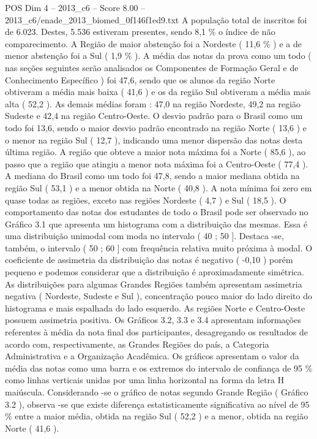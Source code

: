 \begin{textsample}{POS Dim 4 – 2013\_c6 – Score 8.00 – 2013\_c6/enade\_2013\_biomed\_0f146f1ed9.txt}
A população total de inscritos foi de 6.023.
Destes, 5.536 estiveram presentes, sendo 8,1 \% o índice de não comparecimento.
A Região de maior abstenção foi a Nordeste ( 11,6 \% ) e a de menor abstenção foi a Sul ( 1,9 \% ).
A média das notas da prova como um todo ( nas seções seguintes serão analisados os Componentes de Formação Geral e de Conhecimento Específico ) foi 47,6, sendo que os alunos da região Norte obtiveram a média mais baixa ( 41,6 ) e os da região Sul obtiveram a média mais alta ( 52,2 ).
As demais médias foram : 47,0 na região Nordeste, 49,2 na região Sudeste e 42,4 na região Centro-Oeste.
O desvio padrão para o Brasil como um todo foi 13,6, sendo o maior desvio padrão encontrado na região Norte ( 13,6 ) e o menor na região Sul ( 12,7 ), indicando uma menor dispersão das notas desta última região.
A região que obteve a maior nota máxima foi a Norte ( 85,6 ), ao passo que a região que atingiu a menor nota máxima foi a Centro-Oeste ( 77,4 ).
A mediana do Brasil como um todo foi 47,8, sendo a maior mediana obtida na região Sul ( 53,1 ) e a menor obtida na Norte ( 40,8 ).
A nota mínima foi zero em quase todas as regiões, exceto nas regiões Nordeste ( 4,7 ) e Sul ( 18,5 ).
O comportamento das notas dos estudantes de todo o Brasil pode ser observado no Gráfico 3.1 que apresenta um histograma com a distribuição das mesmas.
Essa é uma distribuição unimodal com moda no intervalo ( 40 ; 50 ].
Destaca -se, também, o intervalo ( 50 ; 60 ] com frequência relativa muito próxima à modal.
O coeficiente de assimetria da distribuição das notas é negativo ( -0,10 ) porém pequeno e podemos considerar que a distribuição é aproximadamente simétrica.
As distribuições para algumas Grandes Regiões também apresentam assimetria negativa ( Nordeste, Sudeste e Sul ), concentração pouco maior do lado direito do histograma e mais espalhada do lado esquerdo.
As regiões Norte e Centro-Oeste possuem assimetria positiva.
Os Gráficos 3.2, 3.3 e 3.4 apresentam informações referentes à média da nota final dos participantes, desagregando os resultados de acordo com, respectivamente, as Grandes Regiões do país, a Categoria Administrativa e a Organização Acadêmica.
Os gráficos apresentam o valor da média das notas como uma barra e os extremos do intervalo de confiança de 95 \% como linhas verticais unidas por uma linha horizontal na forma da letra H maiúscula.
Considerando -se o gráfico de notas segundo Grande Região ( Gráfico 3.2 ), observa -se que existe diferença estatisticamente significativa ao nível de 95 \% entre a maior média, obtida na região Sul ( 52,2 ) e a menor, obtida na região Norte ( 41,6 ).

\end{textsample}
